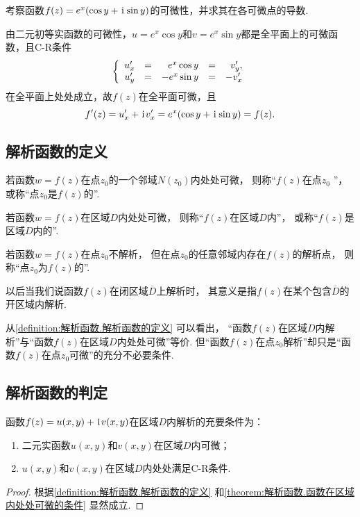 \begin{example}
考察函数\(f(z) = e^x (\cos y + \kern1pt\mathrm{i}\kern1pt \sin y)\)的可微性，并求其在各可微点的导数.
\begin{solution}
由二元初等实函数的可微性，\(u = e^x \cos y\)和\(v = e^x \sin y\)都是全平面上的可微函数，且C-R条件\[
\left\{ \begin{array}{*5r}
u'_x &=& e^x \cos y &=& v'_y, \\
u'_y &=& - e^x \sin y &=& - v'_x
\end{array} \right.
\]在全平面上处处成立，故\(f(z)\)在全平面可微，且\[
f'(z) = u'_x + \kern1pt\mathrm{i}\kern1pt v'_x = e^x (\cos y + \kern1pt\mathrm{i}\kern1pt \sin y) = f(z).
\]
\end{solution}
\end{example}

\subsection{解析函数的定义}
\begin{definition}\label{definition:解析函数.解析函数的定义}
若函数\(w=f(z)\)在点\(z_0\)的一个邻域\(N(z_0)\)内处处可微，
则称“\(f(z)\)在点\(z_0\) ”，
或称“点\(z_0\)是\(f(z)\)的”.

若函数\(w=f(z)\)在区域\(D\)内处处可微，
则称“\(f(z)\)在区域\(D\)内”，
或称“\(f(z)\)是区域\(D\)内的”.

若函数\(w=f(z)\)在点\(z_0\)不解析，
但在点\(z_0\)的任意邻域内存在\(f(z)\)的解析点，
则称“点\(z_0\)为\(f(z)\)的”.
\end{definition}
以后当我们说函数\(f(z)\)在闭区域\(\overline{D}\)上解析时，
其意义是指\(f(z)\)在某个包含\(\overline{D}\)的开区域内解析.

从\cref{definition:解析函数.解析函数的定义} 可以看出，
“函数\(f(z)\)在区域\(D\)内解析”与“函数\(f(z)\)在区域\(D\)内处处可微”等价.
但“函数\(f(z)\)在点\(z_0\)解析”却只是“函数\(f(z)\)在点\(z_0\)可微”的充分不必要条件.

\subsection{解析函数的判定}
\begin{theorem}\label{theorem:解析函数.函数在区域内处处解析的充要条件}
函数\(f(z)=u(x,y)+\kern1pt\mathrm{i}\kern1pt v(x,y)\)在区域\(D\)内解析的充要条件为：
\begin{enumerate}
\item 二元实函数\(u(x,y)\)和\(v(x,y)\)在区域\(D\)内可微；
\item \(u(x,y)\)和\(v(x,y)\)在区域\(D\)内处处满足C-R条件.
\end{enumerate}
\begin{proof}
根据\cref{definition:解析函数.解析函数的定义} 和\cref{theorem:解析函数.函数在区域内处处可微的条件} 显然成立.
\end{proof}
\end{theorem}

